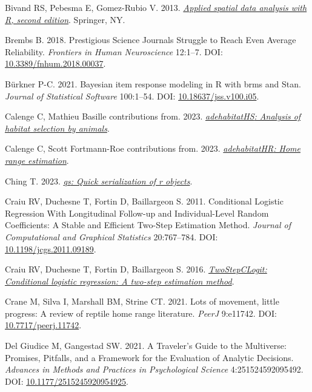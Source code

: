 \documentclass[10pt,a4paper]{article}
\newlength{\cslhangindent}
\newenvironment{CSLReferences}[2] %
 {\begin{list}{}{%
  \setlength{\itemindent}{0pt}
  \setlength{\leftmargin}{0pt}
  \setlength{\parsep}{0pt}
  \ifodd #1
   \setlength{\leftmargin}{\cslhangindent}
   \setlength{\itemindent}{-1\cslhangindent}
  \fi
  \setlength{\itemsep}{#2\baselineskip}}}
 {\end{list}}
\begin{document}
\begin{CSLReferences}{1}{0}
Bivand RS, Pebesma E, Gomez-Rubio V. 2013. \emph{\href{https://asdar-book.org/}{Applied spatial data analysis with {R}, second edition}}. Springer, NY.

Brembs B. 2018. Prestigious {Science} {Journals} {Struggle} to {Reach} {Even} {Average} {Reliability}. \emph{Frontiers in Human Neuroscience} 12:1--7. DOI: \href{https://doi.org/10.3389/fnhum.2018.00037}{10.3389/fnhum.2018.00037}.

Bürkner P-C. 2021. Bayesian item response modeling in {R} with {brms} and {Stan}. \emph{Journal of Statistical Software} 100:1--54. DOI: \href{https://doi.org/10.18637/jss.v100.i05}{10.18637/jss.v100.i05}.

Calenge C, Mathieu Basille contributions from. 2023. \emph{\href{https://CRAN.R-project.org/package=adehabitatHS}{{adehabitatHS}: Analysis of habitat selection by animals}}.

Calenge C, Scott Fortmann-Roe contributions from. 2023. \emph{\href{https://CRAN.R-project.org/package=adehabitatHR}{{adehabitatHR}: Home range estimation}}.

Ching T. 2023. \emph{\href{https://CRAN.R-project.org/package=qs}{{qs}: Quick serialization of r objects}}.

Craiu RV, Duchesne T, Fortin D, Baillargeon S. 2011. Conditional {Logistic} {Regression} {With} {Longitudinal} {Follow}-up and {Individual}-{Level} {Random} {Coefficients}: {A} {Stable} and {Efficient} {Two}-{Step} {Estimation} {Method}. \emph{Journal of Computational and Graphical Statistics} 20:767--784. DOI: \href{https://doi.org/10.1198/jcgs.2011.09189}{10.1198/jcgs.2011.09189}.

Craiu RV, Duchesne T, Fortin D, Baillargeon S. 2016. \emph{\href{https://CRAN.R-project.org/package=TwoStepCLogit}{TwoStepCLogit: Conditional logistic regression: A two-step estimation method}}.

Crane M, Silva I, Marshall BM, Strine CT. 2021. Lots of movement, little progress: A review of reptile home range literature. \emph{PeerJ} 9:e11742. DOI: \href{https://doi.org/10.7717/peerj.11742}{10.7717/peerj.11742}.

Del Giudice M, Gangestad SW. 2021. A {Traveler}'s {Guide} to the {Multiverse}: {Promises}, {Pitfalls}, and a {Framework} for the {Evaluation} of {Analytic} {Decisions}. \emph{Advances in Methods and Practices in Psychological Science} 4:251524592095492. DOI: \href{https://doi.org/10.1177/2515245920954925}{10.1177/2515245920954925}.


\end{CSLReferences}
\end{document}
